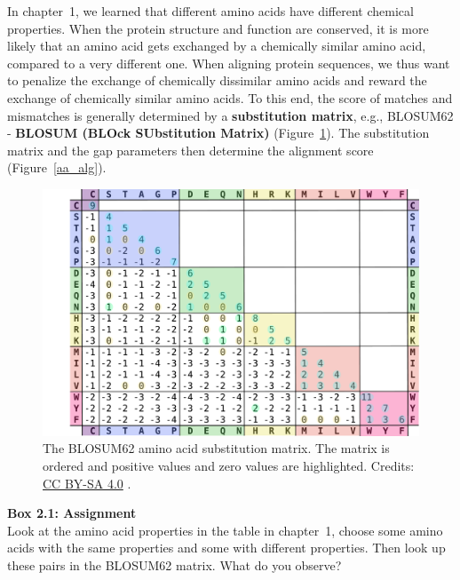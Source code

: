 In chapter~1, we learned that different amino acids have different chemical properties.
When the protein structure and function are conserved, it is more likely that an amino acid gets exchanged by a chemically similar amino acid, compared to a very different one.
When aligning protein sequences, we thus want to penalize the exchange of chemically dissimilar amino acids and reward the exchange of chemically similar amino acids.
To this end, the score of matches and mismatches is generally determined by a \textbf{substitution matrix}, e.g., BLOSUM62 - \textbf{BLOSUM (BLOck SUbstitution Matrix)} (Figure~\ref{blosum62}).
The substitution matrix and the gap parameters then determine the alignment score (Figure~\ref{aa_alg}).

\begin{figure}[!htbp]
\centering
\includegraphics[width=1\linewidth]{files/blosum62-998aa3486f71a507d639852ff7479e95.pdf}
\caption[]{The BLOSUM62 amino acid substitution matrix.
The matrix is ordered and positive values and zero values are highlighted.
Credits: \href{https://creativecommons.org/licenses/by-sa/4.0/}{CC BY-SA 4.0} \cite{blosum62_2022}.}
\label{blosum62}
\end{figure}

\begin{framed}
\textbf{Box 2.1: Assignment}\\
Look at the amino acid properties in the table in chapter~1, choose some amino acids with the same properties and some with different properties.
Then look up these pairs in the BLOSUM62 matrix.
What do you observe?
\end{framed}

